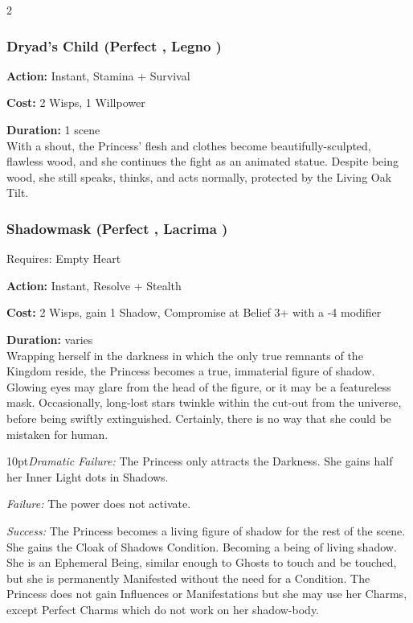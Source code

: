 \begin{multicols}{2}
\subsubsection*{Dryad's Child (Perfect \textbullet\textbullet\textbullet\textbullet\textbullet, Legno \textbullet\textbullet\textbullet\textbullet)}

\noindent \textbf{Action:} Instant, Stamina + Survival

\noindent \textbf{Cost:} 2 Wisps, 1 Willpower

\noindent \textbf{Duration:} 1 scene \\

\noindent  With a shout, the Princess' flesh and clothes become beautifully-sculpted, flawless wood, and she continues the fight as an animated statue. Despite being wood, she still speaks, thinks, and acts normally, protected by the Living Oak Tilt.
\subsubsection*{Shadowmask (Perfect \textbullet\textbullet\textbullet\textbullet\textbullet, Lacrima \textbullet\textbullet\textbullet)}

\noindent Requires: Empty Heart

\noindent \textbf{Action:} Instant, Resolve + Stealth

\noindent \textbf{Cost:} 2 Wisps, gain 1 Shadow, Compromise at Belief 3+ with a -4 modifier

\noindent \textbf{Duration:} varies \\

\noindent Wrapping herself in the darkness in which the only true remnants of the Kingdom reside, the Princess becomes a true, immaterial figure of shadow. Glowing eyes may glare from the head of the figure, or it may be a featureless mask. Occasionally, long-lost stars twinkle within the cut-out from the universe, before being swiftly extinguished. Certainly, there is no way that she could be mistaken for human.

    \begin{myindentpar}{10pt}\emph{Dramatic Failure:} The Princess only attracts the Darkness. She gains half her Inner Light dots in Shadows.

    \emph{Failure:} The power does not activate.

    \emph{Success:} The Princess becomes a living figure of shadow for the rest of the scene. She gains the Cloak of Shadows Condition. Becoming a being of living shadow. She is an Ephemeral Being, similar enough to Ghosts to touch and be touched, but she is permanently Manifested without the need for a Condition. The Princess does not gain Influences or Manifestations but she may use her Charms, except Perfect Charms which do not work on her shadow-body.


\end{myindentpar}
\end{multicols}
